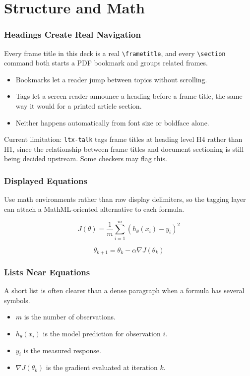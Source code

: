 \documentclass[aspect-ratio=16:9]{ltx-talk}
\begin{document}
\section{Structure and Math}

\begin{frame}
	\frametitle{Headings Create Real Navigation}
	Every frame title in this deck is a real \texttt{\textbackslash frametitle}, and every \texttt{\textbackslash section} command both starts a PDF bookmark and groups related frames.

	\begin{itemize}
		\item Bookmarks let a reader jump between topics without scrolling.
		\item Tags let a screen reader announce a heading before a frame title, the same way it would for a printed article section.
		\item Neither happens automatically from font size or boldface alone.
	\end{itemize}

	\alert{Current limitation:} \texttt{ltx-talk} tags frame titles at heading level H4 rather than H1, since the relationship between frame titles and document sectioning is still being decided upstream. Some checkers may flag this.
\end{frame}

\begin{frame}
	\frametitle{Displayed Equations}
	Use math environments rather than raw display delimiters, so the tagging layer can attach a MathML-oriented alternative to each formula.

	\begin{equation}
		J(\theta)=\frac{1}{m}\sum_{i=1}^{m}\left(h_\theta(x_i)-y_i\right)^2
		\label{eq:objective}
	\end{equation}

	\begin{equation}
		\theta_{k+1}=\theta_k-\alpha\nabla J(\theta_k)
		\label{eq:gradient-update}
	\end{equation}
\end{frame}

\begin{frame}
	\frametitle{Lists Near Equations}
	A short list is often clearer than a dense paragraph when a formula has several symbols.

	\begin{itemize}
		\item $m$ is the number of observations.
		\item $h_\theta(x_i)$ is the model prediction for observation $i$.
		\item $y_i$ is the measured response.
		\item $\nabla J(\theta_k)$ is the gradient evaluated at iteration $k$.
	\end{itemize}
\end{frame}
\end{document}
